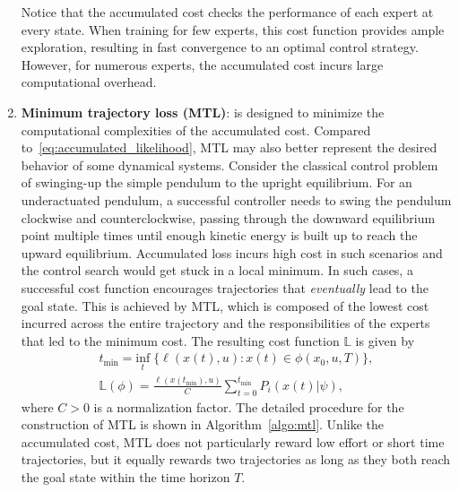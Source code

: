 \begin{enumerate}
    \begin{rem}    
        Notice that the accumulated cost checks the performance of each expert at
        every state.
        When training for few experts, this cost function provides ample
        exploration, resulting in fast convergence to an optimal control strategy.
        However, for numerous experts, the accumulated cost incurs large
        computational overhead.
    \end{rem}

    \item \textbf{Minimum trajectory loss (MTL)}: is designed to minimize the
    computational complexities of the accumulated cost.
    Compared to~\eqref{eq:accumulated_likelihood}, MTL may also better represent
    the desired behavior of some dynamical systems.
    Consider the classical control problem of swinging-up the simple pendulum to
    the upright equilibrium. 
    For an underactuated pendulum, a successful controller needs to swing the
    pendulum clockwise and counterclockwise, passing through the downward
    equilibrium point multiple times until enough kinetic energy is built up to
    reach the upward equilibrium.
    Accumulated loss incurs high cost in such scenarios and the control
    search would get stuck in a local minimum.
    In such cases, a successful cost function encourages trajectories that
    \textit{eventually} lead to the goal state.
    This is achieved by MTL, which is composed of the lowest cost incurred
    across the entire trajectory and the responsibilities of the experts that
    led to the minimum cost.
    The resulting cost function $\mathbb{L}$ is given by
    \begin{equation}
        \begin{gathered}
            t_{\text{min}} = \underset{t}{\textrm{inf}} \; \{ \ell(x(t), u): x(t) \in \phi(x_0, u, T) \},  \\
            \mathbb{L}(\phi) = \frac{\ell(x(t_{\text{min}}), u)}{C} \sum_{t=0}^{t_{\text{min}}}P_i(x(t) | \psi), 
        \end{gathered} 
    \end{equation}
    \noindent where $C > 0$ is a normalization factor.
    The detailed procedure for the construction of MTL is shown in
    Algorithm~\eqref{algo:mtl}.
    Unlike the accumulated cost, MTL does not particularly reward low effort or
    short time trajectories, but it equally rewards two trajectories
    as long as they both reach the goal state within the time horizon $T$. 

\end{enumerate}
